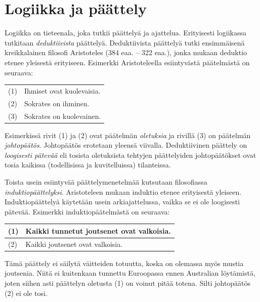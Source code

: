\chapter{Logiikka ja päättely}%

Logiikka on tieteenala, joka tutkii päättelyä ja ajattelua. Erityisesti logiikassa tutkitaan \emph{deduktiivista} päättelyä. Deduktiivista päättelyä tutki ensimmäisenä kreikkalainen filosofi Aristoteles (384 eaa. -- 322 eaa.), jonka mukaan deduktio etenee yleisestä erityiseen. Esimerkki Aristoteleella esiintyvästä pää\-tel\-mäs\-tä on seuraava:

\bigskip

\begin{center}
\begin{tabular}{ll}
(1) & Ihmiset ovat kuolevaisia.\\ 
(2) & Sokrates on ihminen.\\ \hline
(3) & Sokrates on kuolevainen.
\end{tabular}
\end{center}

\bigskip

Esimerkissä rivit (1) ja (2) ovat päätelmän \emph{oletuksia} ja rivillä (3) on päätelmän \emph{johtopäätös}. Johtopäätös erotetaan yleensä viivalla. Deduktiivinen päättely on {\em loogisesti pätevää} eli tosista oletuksista tehtyjen päättelyiden johtopäätökset ovat tosia kaikissa (todellisissa ja kuvitelluissa) tilanteissa.

Toista usein esiintyvää päättelymenetelmää kutsutaan filosofiassa \emph{induktiopäättelyksi}. Aristoteleen mukaan induktio etenee erityisestä yleiseen.  Induktiopäättelyä käytetään usein arkiajattelussa, vaikka se ei ole loogisesti pätevää. Esimerkki induktiopäätelmästä on seuraava:

\bigskip

\begin{center}
\begin{tabular}{ll}
(1) & Kaikki tunnetut joutsenet ovat valkoisia.\\ \hline
(2) & Kaikki joutsenet ovat valkoisia.
\end{tabular}
\end{center}

\bigskip

Tämä päättely ei säilytä väitteiden totuutta, koska on olemassa myös mustia joutsenia. Niitä ei kuitenkaan tunnettu Euroopassa ennen Australian löytämistä, joten siihen asti päättelyn oletusta (1) on voinut pitää totena. Silti johtopäätös (2) ei ole tosi.

